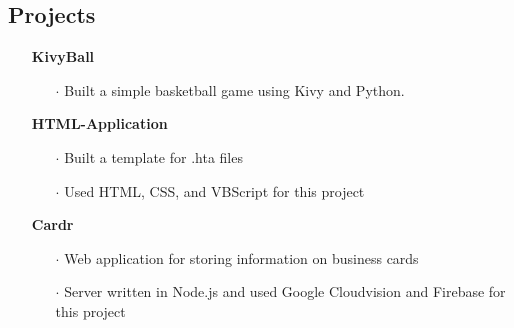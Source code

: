 \documentclass[11pt,letterpaper]{moderncv}
\begin{document}
\subsection{Projects}

\begin{itemize}
	\item[]{\textbf{KivyBall}}
	\vspace{-8pt}
	\begin{itemize}
		\item[$\cdot$] Built a simple basketball game using Kivy and Python.
	\end{itemize}
	\vspace{-12pt}
	\item[]{\textbf{HTML-Application}}
	\vspace{-8pt}
	\begin{itemize}
        \item[$\cdot$] Built a template for .hta files 
		\vspace{-4pt}
		\item[$\cdot$] Used HTML, CSS, and VBScript for this project
	\end{itemize}
	\vspace{-12pt}
	\item[]{\textbf{Cardr}}
	\vspace{-8pt}
	\begin{itemize}
        \item[$\cdot$] Web application for storing information on business cards
		\vspace{-4pt}
		\item[$\cdot$] Server written in Node.js and used Google Cloudvision and Firebase for this project
	\end{itemize}
\end{itemize}
\end{document}
